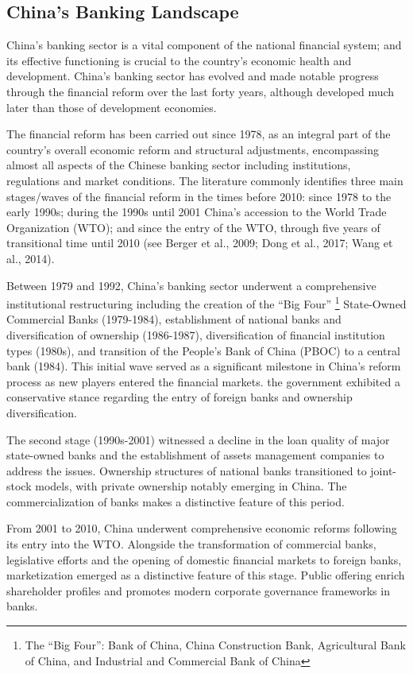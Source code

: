 \documentclass[
  letterpaper,
  DIV=11,
  numbers=noendperiod]{scrreprt}
\begin{document}
\subsection{China's Banking Landscape}\label{chinas-banking-landscape}

China's banking sector is a vital component of the national financial
system; and its effective functioning is crucial to the country's
economic health and development. China's banking sector has evolved and
made notable progress through the financial reform over the last forty
years, although developed much later than those of development
economies.

The financial reform has been carried out since 1978, as an integral
part of the country's overall economic reform and structural
adjustments, encompassing almost all aspects of the Chinese banking
sector including institutions, regulations and market conditions. The
literature commonly identifies three main stages/waves of the financial
reform in the times before 2010: since 1978 to the early 1990s; during
the 1990s until 2001 China's accession to the World Trade Organization
(WTO); and since the entry of the WTO, through five years of
transitional time until 2010 (see Berger et al., 2009; Dong et al.,
2017; Wang et al., 2014).

Between 1979 and 1992, China's banking sector underwent a comprehensive
institutional restructuring including the creation of the ``Big Four''
\footnote{The ``Big Four'': Bank of China, China Construction Bank,
  Agricultural Bank of China, and Industrial and Commercial Bank of
  China} State-Owned Commercial Banks (1979-1984), establishment of
national banks and diversification of ownership (1986-1987),
diversification of financial institution types (1980s), and transition
of the People's Bank of China (PBOC) to a central bank (1984). This
initial wave served as a significant milestone in China's reform process
as new players entered the financial markets. the government exhibited a
conservative stance regarding the entry of foreign banks and ownership
diversification.

The second stage (1990s-2001) witnessed a decline in the loan quality of
major state-owned banks and the establishment of assets management
companies to address the issues. Ownership structures of national banks
transitioned to joint-stock models, with private ownership notably
emerging in China. The commercialization of banks makes a distinctive
feature of this period.

From 2001 to 2010, China underwent comprehensive economic reforms
following its entry into the WTO. Alongside the transformation of
commercial banks, legislative efforts and the opening of domestic
financial markets to foreign banks, marketization emerged as a
distinctive feature of this stage. Public offering enrich shareholder
profiles and promotes modern corporate governance frameworks in banks.
\end{document}
